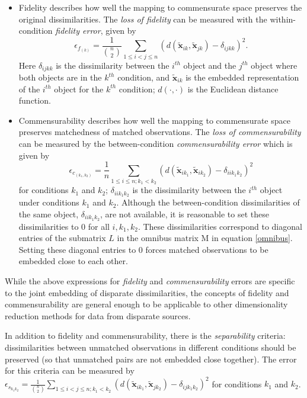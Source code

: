 \documentclass[12pt]{article} %
\begin{document}
\begin{itemize}
\item Fidelity describes how well the mapping to commensurate space preserves the original dissimilarities. The \emph{loss of fidelity} can be measured with the  within-condition \emph{ fidelity error}, given by
    \[
\epsilon_{f_{(k)}} = \frac{1}{{{n}\choose{2}}} \sum_{1 \leq i < j \leq n} (d(\widetilde{\bm{x}}_{ik},\widetilde{\bm{x}}_{jk})-\delta_{ijkk})^2
.\] 
Here $\delta_{ijkk}$ is the dissimilarity between the $i^{th}$ object and the $j^{th}$ object where both objects are in the $k^{th}$  condition, and $\widetilde{\bm{x}}_{ik}$ is the embedded representation of the $i^{th}$ object  for the $k^{th}$ condition;  $d(\cdot,\cdot)$ is the Euclidean distance function.

\item Commensurability describes how well the mapping to commensurate space preserves matchedness of matched observations. The \emph{loss of commensurability} can be measured by the between-condition {\em commensurability error} which is given by
    \[
\epsilon_{c_{(k_1,k_2)}} = \frac{1}{n} \sum_{1 \leq i \leq n;k_1 <k_2} (d(\widetilde{\bm{x}}_{ik_1},\widetilde{\bm{x}}_{ik_2})- { \delta_{iik_1k_2}})^2
\label{comm-error}
\]
 for conditions $k_1$ and $k_2$; $\delta_{iik_1k_2}$  is the dissimilarity between the $i^{th}$ object under  conditions   $k_1$ and  $k_2$. 
Although  the between-condition dissimilarities of the same object, ${ \delta_{iik_1k_2}}$, are not available,  it is reasonable to set these dissimilarities to $0$ for all $i,k_1,k_2$. These dissimilarities correspond to  diagonal  entries of the  submatrix $L$ in  the omnibus matrix  M in equation \eqref{omnibus}. Setting these diagonal entries to $0$ forces matched observations to be embedded close to each other. \label{commens}  
\end{itemize}

While  the above expressions for  \emph{fidelity} and  \emph{commensurability} errors  are specific to the joint embedding of disparate dissimilarities, the concepts of fidelity and commensurability are  general enough to be applicable to other dimensionality reduction methods for data from disparate sources. 

 In addition to fidelity and commensurability, there is the \emph{separability} criteria:  dissimilarities between unmatched  observations in different conditions  should be preserved (so that unmatched pairs are not embedded close together).  The error for this criteria can be measured by  $\epsilon_{s_{k_1k_2}} = \frac{1}{{{n}\choose{2}}} \sum_{1 \leq i < j \leq n;k_1 <k_2} (d(\widetilde{\bm{x}}_{ik_1},\widetilde{\bm{x}}_{jk_2})-{ \delta_{ijk_1k_2}})^2$ for  conditions   $k_1$ and  $k_2$.
\end{document}
